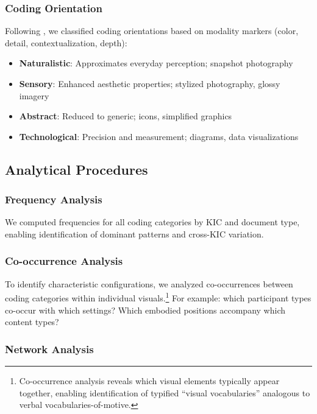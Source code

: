 \documentclass[../main.tex]{subfiles}
\begin{document}
\subsubsection{Coding Orientation}

Following \cite{kress2006reading}, we classified coding orientations based on modality markers (color, detail, contextualization, depth):

\begin{itemize}
    \item \textbf{Naturalistic}: Approximates everyday perception; snapshot photography
    \item \textbf{Sensory}: Enhanced aesthetic properties; stylized photography, glossy imagery
    \item \textbf{Abstract}: Reduced to generic; icons, simplified graphics
    \item \textbf{Technological}: Precision and measurement; diagrams, data visualizations
\end{itemize}

\subsection{Analytical Procedures}

\subsubsection{Frequency Analysis}

We computed frequencies for all coding categories by KIC and document type, enabling identification of dominant patterns and cross-KIC variation.

\subsubsection{Co-occurrence Analysis}

To identify characteristic configurations, we analyzed co-occurrences between coding categories within individual visuals.\footnote{Co-occurrence analysis reveals which visual elements typically appear together, enabling identification of typified ``visual vocabularies'' analogous to verbal vocabularies-of-motive.} For example: which participant types co-occur with which settings? Which embodied positions accompany which content types?

\subsubsection{Network Analysis}
\end{document}
